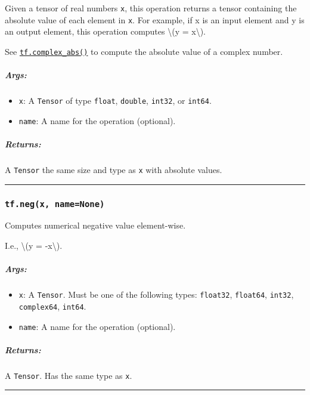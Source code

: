 Given a tensor of real numbers \texttt{x}, this operation returns a
tensor containing the absolute value of each element in \texttt{x}. For
example, if x is an input element and y is an output element, this
operation computes \textbackslash{}(y =
\textbar{}x\textbar{}\textbackslash{}).

See \protect\hyperlink{tfux5fcomplexux5fabs}{\texttt{tf.complex\_abs()}}
to compute the absolute value of a complex number.

\subparagraph{Args: }\label{args-6}

\begin{itemize}
\tightlist
\item
  \texttt{x}: A \texttt{Tensor} of type \texttt{float}, \texttt{double},
  \texttt{int32}, or \texttt{int64}.
\item
  \texttt{name}: A name for the operation (optional).
\end{itemize}

\subparagraph{Returns: }\label{returns-6}

A \texttt{Tensor} the same size and type as \texttt{x} with absolute
values.

\begin{center}\rule{0.5\linewidth}{\linethickness}\end{center}

\subsubsection{\texorpdfstring{\texttt{tf.neg(x,\ name=None)}
}{tf.neg(x, name=None) }}\label{tf.negx-namenone}

Computes numerical negative value element-wise.

I.e., \textbackslash{}(y = -x\textbackslash{}).

\subparagraph{Args: }\label{args-7}

\begin{itemize}
\tightlist
\item
  \texttt{x}: A \texttt{Tensor}. Must be one of the following types:
  \texttt{float32}, \texttt{float64}, \texttt{int32},
  \texttt{complex64}, \texttt{int64}.
\item
  \texttt{name}: A name for the operation (optional).
\end{itemize}

\subparagraph{Returns: }\label{returns-7}

A \texttt{Tensor}. Has the same type as \texttt{x}.

\begin{center}\rule{0.5\linewidth}{\linethickness}\end{center}

